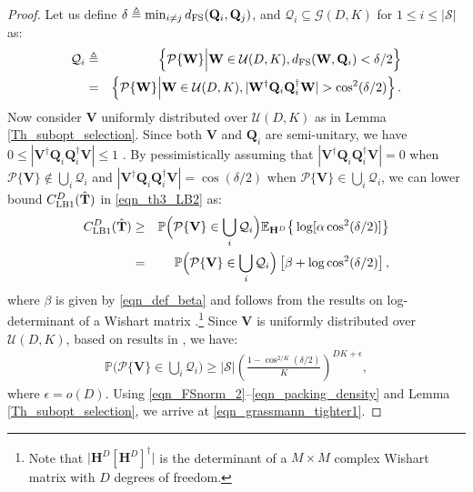 \documentclass[journal,comsoc]{IEEEtran}
\begin{document}
\begin{proof}
Let us define $\delta \triangleq \min_{i \neq j} d_{\rm FS}(\mathbf{Q}_i, \mathbf{Q}_j)$, and $\mathcal{Q}_i \subseteq \mathcal{G}(D,K)$ for $1 \leq i \leq |\mathcal{S}|$ as:
\begin{eqnarray}
\mathcal{Q}_i & \triangleq & \left \{ \mathcal{P}\{\mathbf{W}\} \Big| \mathbf{W} \in \mathcal{U}(D,K), d_{\rm FS}( \mathbf{W}, \mathbf{Q}_i) < \delta/2 \right \} \nonumber \\
&=& \left \{ \mathcal{P}\{\mathbf{W}\} \Big| \mathbf{W} \in \mathcal{U}(D,K), |\mathbf{W}^{\dag} \mathbf{Q}_i \mathbf{Q}_i^{\dag} \mathbf{W}| > \cos^2(\delta/2) \right \}. \nonumber
\end{eqnarray}
Now consider $\mathbf{V}$ uniformly distributed over $\mathcal{U}(D,K)$ as in Lemma \ref{Th_subopt_selection}. Since both $\mathbf{V}$ and $\mathbf{Q}_i$ are semi-unitary, we have $0 \leq |\mathbf{V}^{\dag} \mathbf{Q}_i \mathbf{Q}_i^{\dag} \mathbf{V}| \leq 1$ \cite{Roger1990}. By pessimistically assuming that $|\mathbf{V}^{\dag} \mathbf{Q}_i \mathbf{Q}_i^{\dag} \mathbf{V}| = 0$ when $\mathcal{P}\{\mathbf{V}\} \notin \bigcup_{i} \mathcal{Q}_i$ and $|\mathbf{V}^{\dag} \mathbf{Q}_i \mathbf{Q}_i^{\dag} \mathbf{V}| = \cos(\delta/2)$ when $\mathcal{P}\{\mathbf{V}\} \in \bigcup_i \mathcal{Q}_i$, we can lower bound $C^{D}_{\rm LB1}(\hat{\mathbf{T}})$ in \eqref{eqn_th3_LB2} as:
\begin{eqnarray}
C^{D}_{\rm LB1}(\hat{\mathbf{T}}) & \geq & \mathbb{P} \Big( \mathcal{P}\{\mathbf{V}\} \in \bigcup_i \mathcal{Q}_i \Big) \mathbb{E}_{\mathbf{H}^D} \big\{ \log [\alpha\cos^2(\delta/2)] \big\} \nonumber \\
&=& \mathbb{P} \Big( \mathcal{P}\{\mathbf{V}\} \in \bigcup_i \mathcal{Q}_i \Big) \left[ \beta + \log \cos^2(\delta/2) \right],  \label{eqn_FSnorm_2}
\end{eqnarray}
where $\beta$ is given by \eqref{eqn_def_beta} and follows from the results on log-determinant of a Wishart matrix \cite{Goodman1963}.\footnote{Note that $\big|\mathbf{H}^D {[\mathbf{H}^D]}^{\dag} \big|$ is the determinant of a $M \times M$ complex Wishart matrix with $D$ degrees of freedom.} 
%
Since $\mathbf{V}$ is uniformly distributed over $\mathcal{U}(D,K)$, based on results in \cite{Love_SMux, Barg_grassmann}, we have:
\begin{eqnarray}
\mathbb{P} \Big( \mathcal{P}\{\mathbf{V}\} \in \bigcup_i \mathcal{Q}_i \Big) \geq |\mathcal{S}| {\left( \frac{1-\cos^{2/K}(\delta/2)}{K} \right)}^{D K + \epsilon}, \label{eqn_packing_density}
\end{eqnarray}
where $\epsilon = o(D)$. Using \eqref{eqn_FSnorm_2}--\eqref{eqn_packing_density} and Lemma \ref{Th_subopt_selection}, we arrive at \eqref{eqn_grassmann_tighter1}. 


\end{proof}
\end{document}
